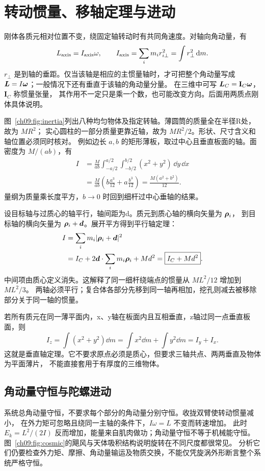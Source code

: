 {\section{转动惯量、移轴定理与进动}
刚体各质元相对位置不变，绕固定轴转动时有共同角速度。对轴向角动量，有
\begin{equation}
 L_{\rm axis}=I_{\rm axis}\omega,\qquad
 I_{\rm axis}=\sum_i m_i r_{i\perp}^2=\int r_\perp^2\mathop{}\!\mathrm d m.
\end{equation}
$r_\perp$ 是到轴的垂距。仅当该轴是相应的主惯量轴时，才可把整个角动量写成
$\bm{L}=I\bm{\omega}$；一般情况下还有垂直于该轴的角动量分量。
在三维中可写 $\bm{L}_C=\mathbf I_C\bm{\omega}$，$\mathbf I_C$ 称惯量张量，
其作用不一定只是乘一个数，也可能改变方向。后面用两质点刚体具体说明。

图~\ref{ch09:fig:inertia}列出八种均匀物体及指定转轴。薄圆筒的质量全在半径R处，故为 $MR^2$；
实心圆柱的一部分质量更靠近轴，故为 $MR^2/2$。形状、尺寸含义和轴位置必须同时核对。
\momentsContextDiagram
例如边长 $a,b$ 的矩形薄板，取过中心且垂直板面的轴。面密度为 $M/(ab)$，有
\begin{align}
 I&=\frac{M}{ab}\int_{-a/2}^{a/2}\int_{-b/2}^{b/2}(x^2+y^2)\,\dd y\,\dd x\\
 &=\frac{M}{ab}\left(b\frac{a^3}{12}+a\frac{b^3}{12}\right)
 =\frac{M(a^2+b^2)}{12}.
\end{align}
量纲为质量乘长度平方，$b\to0$ 时回到细杆过中心垂轴的结果。

设目标轴与过质心的轴平行，轴间距为d。质元到质心轴的横向矢量为 $\bm{\rho}_i$，
到目标轴的横向矢量为 $\bm{\rho}_i+\bm{d}$。展开平方得到平行轴定理：
\begin{align}
 I&=\sum_i m_i|\bm{\rho}_i+\bm{d}|^2\\
 &=I_C+2\bm{d}\cdot\sum_i m_i\bm{\rho}_i+Md^2
 =\boxed{I_C+Md^2}.
\end{align}
中间项由质心定义消失。这解释了同一细杆绕端点的惯量从 $ML^2/12$ 增加到 $ML^2/3$。
两轴必须平行；复合体各部分先移到同一轴再相加，挖孔则减去被移除部分关于同一轴的惯量。

若所有质元在同一薄平面内，x、y轴在板面内且互相垂直，z轴过同一点垂直板面，则
\begin{equation}
 I_z=\int(x^2+y^2)\dd m=\int x^2\dd m+\int y^2\dd m=I_y+I_x.
\end{equation}
这就是垂直轴定理。它不要求原点必须是质心，但要求三轴共点、两两垂直及物体为平面薄片，
不能直接套用于有厚度的三维物体。

\subsection{角动量守恒与陀螺进动}
系统总角动量守恒，不要求每个部分的角动量分别守恒。收拢双臂使转动惯量减小，
在外力矩可忽略且绕同一主轴的条件下，$I\omega=L$ 不变而转速增加。
此时 $E_k=L^2/(2I)$ 反而增加，能量来自肌肉做功；角动量守恒不等于机械能守恒。
图~\ref{ch09:fig:cosmic}的飓风与天体吸积结构说明旋转在不同尺度都很常见。
分析它们仍要检查外力矩、摩擦、角动量输运及物质交换，不能仅凭旋涡外形断言整个系统严格守恒。

}

